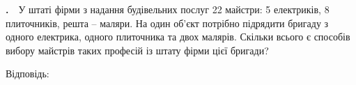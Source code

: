 \documentclass[12pt]{article}
\makeatletter
\renewcommand{\headrulewidth}{0.4pt}
\renewcommand{\footrulewidth}{0.4pt}
\newlength{\nmtcellw}
\newcommand{\nmtSetCell}{\setlength{\nmtcellw}{\dimexpr(\linewidth-10\tabcolsep-6\arrayrulewidth)/5\relax}}
\newcommand{\nmtAnswerBox}{%
\par\nopagebreak\vspace{0.2cm}\noindent
Відповідь:\ \
\begin{tabular}{@{}*{4}{|>{\centering\arraybackslash}p{0.8cm}}|@{\hspace{0.1cm}\textbf{,}\hspace{0.1cm}}*{3}{|>{\centering\arraybackslash}p{0.8cm}}|@{}}
\hline
\rule[-0.2cm]{0pt}{0.7cm} & & & & & & \\
\hline
\end{tabular}
\par\vspace{0.3cm}
}
\newcommand{\matchingGrid}{%
    \sbox{\nmtgridbox}{\matchingGridRaw}%
    \ifdim\wd\nmtgridbox>\linewidth \resizebox{\linewidth}{!}{\usebox{\nmtgridbox}}\else\usebox{\nmtgridbox}\fi}
\newcommand{\matchingGridRaw}{%
    \begingroup
    \renewcommand{\arraystretch}{1.15}
    \setlength{\tabcolsep}{4pt}
    \footnotesize
    \begin{tabular}{r|c|c|c|c|c|}
         \multicolumn{1}{c}{} & \multicolumn{1}{c}{\textbf{А}} & \multicolumn{1}{c}{\textbf{Б}} & \multicolumn{1}{c}{\textbf{В}} & \multicolumn{1}{c}{\textbf{Г}} & \multicolumn{1}{c}{\textbf{Д}} \\ \cline{2-6}
         \textbf{1} & \phantom{X} & \phantom{X} & \phantom{X} & \phantom{X} & \phantom{X} \\ \cline{2-6}
         \textbf{2} & & & & & \\ \cline{2-6}
         \textbf{3} & & & & & \\ \cline{2-6}
    \end{tabular}
    \endgroup
}
\newcounter{zad}
\newcommand{\zadnum}{\stepcounter{zad}\textbf{\thezad.}\ \ }
\newcounter{ans}
\newcommand{\nbvspace}[1]{\nopagebreak\vspace{#1}}
\newcommand{\nmtnobreak}{\ifvmode\penalty10000 \fi}
\renewcommand{\nmtAnswerBox}{%
\par\nopagebreak\vspace{0.2cm}\noindent
Відповідь:\ \
\begin{tabular}{@{}*{5}{|>{\centering\arraybackslash}p{0.8cm}}|@{\hspace{0.1cm}\textbf{,}\hspace{0.1cm}}*{3}{|>{\centering\arraybackslash}p{0.8cm}}|@{}}
\hline
\rule[-0.2cm]{0pt}{0.7cm} & & & & & & & \\
\hline
\end{tabular}
\par\vspace{0.3cm}
}
\makeatother
\begin{document}
\begin{samepage}
\noindent\zadnum У штаті фірми з надання будівельних послуг 22 майстри: 5 електриків, 8 плиточників, решта – маляри. На один об'єкт потрібно підрядити бригаду з одного електрика, одного плиточника та двох малярів. Скільки всього є способів вибору майстрів таких професій із штату фірми цієї бригади?

\nmtnobreak
\nopagebreak\nbvspace{0.5cm}
\nmtAnswerBox
\par{}
\end{samepage}
\endgroup

\begingroup
\renewcommand{\headrulewidth}{0.4pt}
\renewcommand{\footrulewidth}{0.4pt}

\providecommand{\trigStyle}[1]{#1}
\providecommand{\answerTableSmall}[5]{%
\begingroup\setlength{\tabcolsep}{2pt}\small\nmtSetCell
\begin{tabular}{|*{5}{>{\centering\arraybackslash}m{\nmtcellw}|}}
\hline
\rule[-0.2cm]{0pt}{0.6cm}\textbf{А} & \textbf{Б} & \textbf{В} & \textbf{Г} & \textbf{Д} \\
\hline
\rule[-0.4cm]{0pt}{0.9cm}#1 & \rule[-0.4cm]{0pt}{0.9cm}#2 & \rule[-0.4cm]{0pt}{0.9cm}#3 & \rule[-0.4cm]{0pt}{0.9cm}#4 & \rule[-0.4cm]{0pt}{0.9cm}#5 \\
\hline
\end{tabular}\endgroup}
\providecommand{\matchingLayout}[3]{%
    \noindent
    \begin{minipage}[t]{0.36\textwidth}\vspace{0pt}\raggedright
        #1
    \end{minipage}%
    \hfill
    \begin{minipage}[t]{0.43\textwidth}\vspace{0pt}\raggedright
        #2
    \end{minipage}%
    \hfill
    \begin{minipage}[t]{0.19\textwidth}
        \vspace{0pt}
        \begin{flushright}
        #3
        \end{flushright}
    \end{minipage}}
\providecommand{\matchingLayoutBottom}[2]{%
    \noindent
    \begin{minipage}[t]{0.48\textwidth}\vspace{0pt}\raggedright
        #1
    \end{minipage}%
    \hfill
    \begin{minipage}[t]{0.48\textwidth}\vspace{0pt}\raggedright
        #2
    \end{minipage}
    \vspace{0.5cm}
    \noindent
    \matchingGrid}
\end{document}
